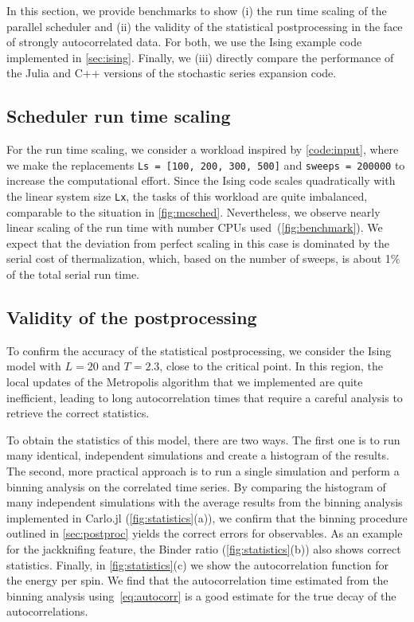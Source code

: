 \documentclass{SciPost}
\begin{document}
In this section, we provide benchmarks to show (i) the run time scaling of the parallel scheduler and (ii) the validity of the statistical postprocessing in the face of strongly autocorrelated data. For both, we use the Ising example code implemented in \cref{sec:ising}. Finally, we (iii) directly compare the performance of the Julia and C++ versions of the stochastic series expansion code.

\subsection{Scheduler run time scaling}
For the run time scaling, we consider a workload inspired by \cref{code:input}, where we make the replacements \texttt{Ls = [100, 200, 300, 500]} and \texttt{sweeps = 200000} to increase the computational effort. Since the Ising code scales quadratically with the linear system size \texttt{Lx}, the tasks of this workload are quite imbalanced, comparable to the situation in \cref{fig:mcsched}. Nevertheless, we observe nearly linear scaling of the run time with number CPUs used~(\cref{fig:benchmark}). We expect that the deviation from perfect scaling in this case is dominated by the serial cost of thermalization, which, based on the number of sweeps, is about 1\% of the total serial run time.

\subsection{Validity of the postprocessing}
To confirm the accuracy of the statistical postprocessing, we consider the Ising model with $L=20$ and $T=2.3$, close to the critical point. In this region, the local updates of the Metropolis algorithm that we implemented are quite inefficient, leading to long autocorrelation times that require a careful analysis to retrieve the correct statistics.

To obtain the statistics of this model, there are two ways. The first one is to run many identical, independent simulations and create a histogram of the results. The second, more practical approach is to run a single simulation and perform a binning analysis on the correlated time series. By comparing the histogram of many independent simulations with the average results from the binning analysis implemented in Carlo.jl (\cref{fig:statistics}(a)), we confirm that the binning procedure outlined in \cref{sec:postproc} yields the correct errors for observables. As an example for the jackknifing feature, the Binder ratio (\cref{fig:statistics}(b)) also shows correct statistics. Finally, in \cref{fig:statistics}(c) we show the autocorrelation function for the energy per spin. We find that the autocorrelation time estimated from the binning analysis using~\cref{eq:autocorr} is a good estimate for the true decay of the autocorrelations.
\end{document}
